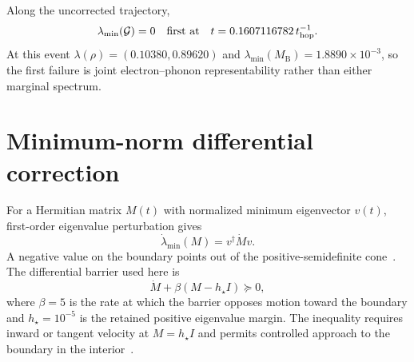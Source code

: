 \documentclass[10pt,twocolumn]{article}
\newcommand{\I}{I}
\newcommand{\MB}{M_{\mathrm B}}
\begin{document}
Along the uncorrected trajectory,
\begin{equation}
\lambda_{\min}(\mathcal G)=0
\quad\text{first at}\quad
t=0.1607116782\,t_{\rm hop}^{-1}.
\label{eq:first-joint-crossing}
\end{equation}
At this event $\lambda(\rho)=(0.10380,0.89620)$ and
$\lambda_{\min}(\MB)=1.8890\times10^{-3}$, so the first failure is joint
electron--phonon representability rather than either marginal spectrum.

\section{Minimum-norm differential correction}

For a Hermitian matrix $M(t)$ with normalized minimum eigenvector $v(t)$,
first-order eigenvalue perturbation gives
\begin{equation}
\dot\lambda_{\min}(M)=v^\dagger\dot Mv.
\label{eq:eigenvalue-velocity}
\end{equation}
A negative value on the boundary points out of the positive-semidefinite
cone~\cite{kato1966}.  The differential barrier used here is
\begin{equation}
\dot M+\beta(M-h_\star\I)\succeq0,
\label{eq:matrix-barrier}
\end{equation}
where $\beta=5$ is the rate at which the barrier opposes motion toward the
boundary and $h_\star=10^{-5}$ is the retained positive eigenvalue margin.
The inequality requires inward or tangent velocity at $M=h_\star\I$ and permits
controlled approach to the boundary in the interior~\cite{ong2025}.
\end{document}

